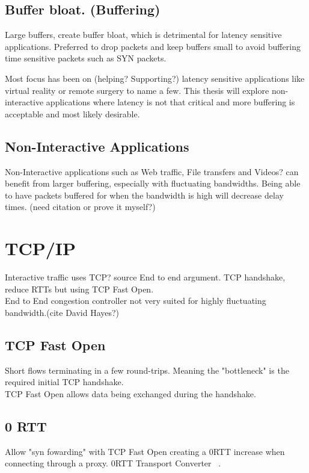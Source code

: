 \documentclass[a4paper,english, 11pt]{report}
\begin{document}
\subsection{Buffer bloat. (Buffering)}
Large buffers, create buffer bloat, which is detrimental for latency sensitive applications. Preferred to drop packets and keep buffers small to avoid buffering time sensitive packets such as SYN packets.

Most focus has been on (helping? Supporting?) latency sensitive applications like virtual reality or remote surgery to name a few. This thesis will explore non-interactive applications where latency is not that critical and more buffering is acceptable and most likely desirable.

\subsection{Non-Interactive Applications}
Non-Interactive applications such as Web traffic, File transfers and Videos? can benefit from larger buffering, especially with fluctuating bandwidths. Being able to have packets buffered for when the bandwidth is high will decrease delay times. (need citation or prove it myself?) 

\section{TCP/IP}

Interactive traffic uses TCP? {source}
End to end argument.
TCP handshake, reduce RTTs but using TCP Fast Open.
\\
End to End congestion controller not very suited for highly fluctuating bandwidth.(cite David Hayes?)

\subsection{TCP Fast Open}
Short flows terminating in a few round-trips. Meaning the "bottleneck" is the required initial TCP handshake.\\
TCP Fast Open allows data being exchanged during the handshake. 

\subsection{0 RTT}
Allow "syn fowarding" with TCP Fast Open creating a 0RTT increase when connecting through a proxy.
0RTT Transport Converter ~\cite{rfc8803}.
\end{document}
